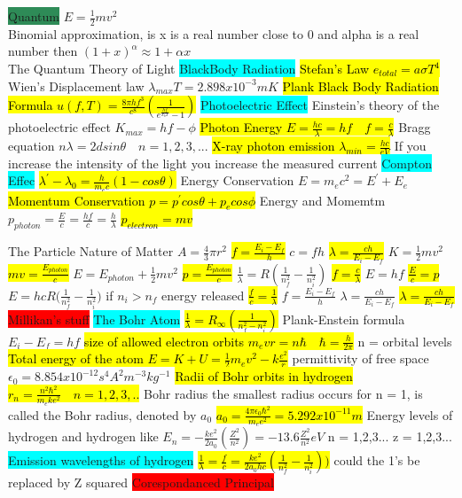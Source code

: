 \documentclass[6pt, oneside]{article}   	%
\begin{document}
\colorbox{SeaGreen}{Quantum}
$E = \frac{1}{2}mv^2$\\
Binomial approximation, is x is a real number close to 0 and alpha is a real number then $(1+x)^{\alpha}\approx1+\alpha x$\\ 
\colorbox{BurntOrange}{The Quantum Theory of Light}
\colorbox{Cyan}{BlackBody Radiation}
\hl{Stefan's Law $e_{total} = a\sigma T^4$}
Wien's Displacement law  $\lambda_{max}T = 2.898x10^{-3} mK$
\hl{Plank Black Body Radiation Formula $u(f,T)=\frac{8\pi hf^3}{c^8}(\frac{1}{e^{\frac{hf}{k_bT}}-1})$}
\colorbox{Cyan}{Photoelectric Effect}
Einstein's theory of the photoelectric effect $K_{max}=hf-\phi$
\hl{Photon Energy $E = \frac{hc}{\lambda} = hf \quad f =\frac{c}{\lambda}$}
Bragg equation $n\lambda = 2dsin\theta \quad n = 1,2,3,...$
\hl{X-ray photon emission $\lambda_{min} = \frac{hc}{eV}$}
If you increase the intensity of the light you increase the measured current
\colorbox{Cyan}{Compton Effec}
\hl{$\lambda^\prime - \lambda_0 = \frac{h}{m_ec}(1-cos\theta)$}
Energy Conservation $E = m_ec^2 = E^{\prime} + E_{e}$
\hl{Momentum Conservation $p = p^{\prime}cos\theta + p_e cos\phi$}
Energy and Momemtm $p_{photon} = \frac{E}{c} = \frac{hf}{c} = \frac{h}{\lambda}$
\hl{$p_{electron} = mv$}

\colorbox{BurntOrange}{The Particle Nature of Matter}
$A = \frac{4}{3}\pi r^2$
\hl{$f=\frac{E_i - E_f}{h}$}
$c = fh$
\hl{$\lambda = \frac{ch}{E_i - E_f}$}
$K = \frac{1}{2}mv^2$ 
\hl{$mv = \frac{E_{photon}}{c}$}
$E= E_{photon} + \frac{1}{2}mv^2$
\hl{$p = \frac{E_{photon}}{c}$}
$\frac{1}{\lambda}=R(\frac{1}{n_f^2}-\frac{1}{n_i^2})$
\hl{$f = \frac{c}{\lambda}$}
$E = hf$
\hl{$\frac{E}{c} = p$}
$E = hcR \big( \frac{1}{n_f^2} - \frac{1}{n_i^2} \big)$ if $n_i > n_f$ energy released
\hl{$\frac{f}{c} = \frac{1}{\lambda}$}
$f = \frac{E_i - E_f}{h}$
$\lambda = \frac{ch}{E_i - E_f}$
\hl{$\lambda = \frac{ch}{E_i - E_f}$}
\colorbox{Red}{Millikan's stuff}
\colorbox{Cyan}{The Bohr Atom}
\hl{$\frac{1}{\lambda}=R_{\infty}(\frac{1}{n_f^2-n_i^2})$}
Plank-Enstein formula $E_i - E_f = hf$
\hl{size of allowed electron orbits $m_evr = n\hbar \quad \hbar = \frac{h}{2\pi}$}
n = orbital levels
\hl{Total energy of the atom $E = K + U = \frac{1}{2}m_ev^2 - k\frac{e^2}{r}$}
permittivity of free space $\epsilon_0 = 8.854x10^{-12} s^4A^2m^{-3}kg^{-1}$
\hl{Radii of Bohr orbits in hydrogen $r_n=\frac{n^2\hbar^2}{m_eke^2} \quad n = 1,2,3,..$}
Bohr radius the smallest radius occurs for n = 1, is called the Bohr radius, denoted by $a_0$
\hl{$a_0 =\frac{4\pi \epsilon_0 \hbar^2}{m_e e^2} = 5.292x10^{-11}m$}
Energy levels of hydrogen and hydrogen like $E_n = -\frac{ke^2}{2a_0}(\frac{Z^2}{n^2})  = -13.6\frac{Z^2}{n^2}eV$ n = 1,2,3... z = 1,2,3...
\colorbox{Cyan}{Emission wavelengths of hydrogen}
\hl{$\frac{1}{\lambda} = \frac{f}{c} = \frac{ke^2}{2a_0hc}(\frac{1}{n_f^2} - \frac{1}{n_i^2}))$}
{could the 1's be replaced by Z squared}
\colorbox{Red}{Corespondanced Principal}
\end{document}
